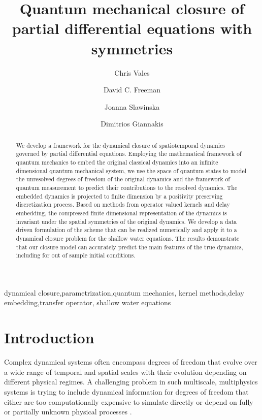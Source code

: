 \documentclass[letterpaper,10pt,3p,preprint]{elsarticle}
\begin{document}
\begin{frontmatter}

\title{Quantum mechanical closure of partial differential
equations with symmetries}

\author[1]{Chris Vales}
\author[1]{David C. Freeman}
\author[1]{Joanna Slawinska}
\author[1]{Dimitrios Giannakis}


\begin{abstract}
We develop a framework for the dynamical closure of spatiotemporal
dynamics governed by partial differential equations.
Employing the mathematical framework of quantum
mechanics to embed the original classical dynamics into an infinite
dimensional quantum mechanical system,
we use the space of quantum states to model the unresolved
degrees of freedom of the original dynamics and the framework
of quantum measurement to predict their contributions to the
resolved dynamics.
The embedded dynamics is projected to finite dimension
by a positivity preserving discretization process.
Based on methods from operator valued kernels
and delay embedding, the compressed finite dimensional
representation of the dynamics is invariant under the
spatial symmetries of the original dynamics.
We develop a data driven formulation of the scheme that can be
realized numerically and apply it to a dynamical closure problem
for the shallow water equations.
The results demonstrate that our closure model can accurately
predict the main features of the true dynamics,
including for out of sample initial conditions.
\end{abstract}

\begin{keyword}
dynamical closure\sep parametrization\sep quantum mechanics\sep
kernel methods\sep delay embedding\sep transfer operator\sep
shallow water equations
\end{keyword}

\end{frontmatter}

\section{Introduction}\label{sec:intro}
Complex dynamical systems often encompass degrees of freedom that
evolve over a wide range of temporal and spatial scales with
their evolution depending on different physical regimes.
A challenging problem in such multiscale, multiphysics systems
is trying to include dynamical information for degrees of freedom
that either are too computationally expensive to simulate directly
or depend on fully or partially unknown physical processes
\cite{WE2011}.
\end{document}
